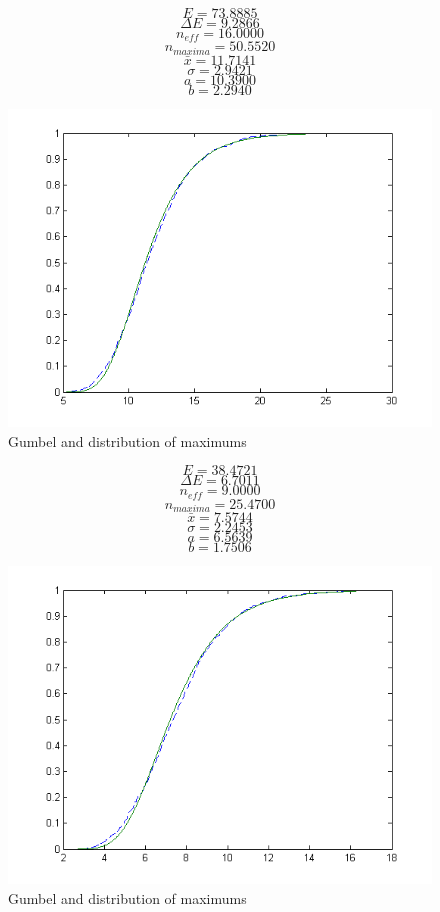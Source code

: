\documentclass[12pt]{article}
\begin{document}
\pagebreak

\[E = 73.8885\]
\[\Delta E = 9.2866\]
\[n_{eff} = 16.0000\]
\[n_{maxima} = 50.5520\]
\[\bar{x} = 11.7141\]
\[\sigma = 2.9421\]
\[a = 10.3900\]
\[b = 2.2940\]

\begin{figure}[hbpt]
	\centering
		\includegraphics[width=1.00\textwidth]{eg6.png}
	\caption{Gumbel and distribution of maximums}
	\label{fig:eg6}
\end{figure}

\pagebreak

\[E = 38.4721\]
\[\Delta E = 6.7011\]
\[n_{eff} = 9.0000\]
\[n_{maxima} = 25.4700\]
\[\bar{x} = 7.5744\]
\[\sigma = 2.2453\]
\[a = 6.5639\]
\[b = 1.7506\]

\begin{figure}[hbpt]
	\centering
		\includegraphics[width=1.00\textwidth]{eg5.png}
	\caption{Gumbel and distribution of maximums}
	\label{fig:eg5}
\end{figure}
\end{document}
